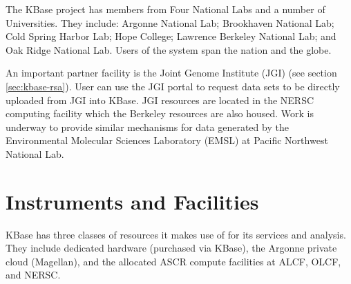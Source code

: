 \documentclass[10pt,a4paper]{report}
\begin{document}
The KBase project has members from Four National Labs and a number of Universities.   They include:
Argonne National Lab; Brookhaven National Lab; Cold Spring Harbor Lab; Hope College; 
Lawrence Berkeley National Lab; and Oak Ridge National Lab.
Users of the system span the nation and the globe.  

An important partner facility is the Joint Genome Institute (JGI) (see section \ref{sec:kbase-rsa}).  User can use the JGI portal to request data sets to be directly uploaded from JGI into KBase.  JGI resources are located in the NERSC computing facility which the Berkeley resources are also housed.
Work is underway to provide similar mechanisms for data generated by the Environmental Molecular Sciences Laboratory (EMSL) at Pacific Northwest National Lab.

\section{Instruments and Facilities}

KBase has three classes of resources it makes use of for its services and analysis.  They include dedicated hardware (purchased via KBase), the Argonne private cloud (Magellan), and the allocated ASCR compute facilities at ALCF, OLCF, and NERSC.  
\end{document}
